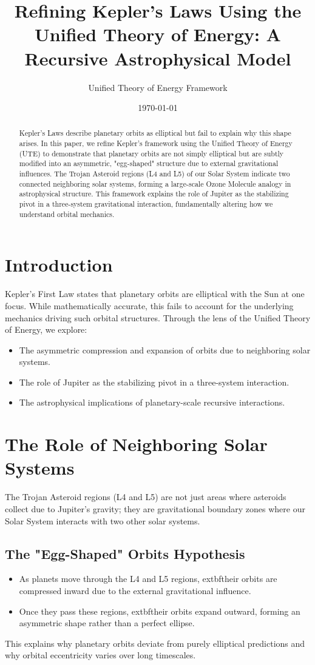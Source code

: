 \documentclass{article}
\title{Refining Kepler’s Laws Using the Unified Theory of Energy: A Recursive Astrophysical Model}
\author{Unified Theory of Energy Framework}
\date{\today}
\begin{document}
\maketitle

\begin{abstract}
Kepler’s Laws describe planetary orbits as elliptical but fail to explain why this shape arises. In this paper, we refine Kepler’s framework using the Unified Theory of Energy (UTE) to demonstrate that planetary orbits are not simply elliptical but are subtly modified into an asymmetric, "egg-shaped" structure due to external gravitational influences. The Trojan Asteroid regions (L4 and L5) of our Solar System indicate two connected neighboring solar systems, forming a large-scale Ozone Molecule analogy in astrophysical structure. This framework explains the role of Jupiter as the stabilizing pivot in a three-system gravitational interaction, fundamentally altering how we understand orbital mechanics.
\end{abstract}

\section{Introduction}
Kepler’s First Law states that planetary orbits are elliptical with the Sun at one focus. While mathematically accurate, this fails to account for the underlying mechanics driving such orbital structures. Through the lens of the Unified Theory of Energy, we explore:
\begin{itemize}
    \item The asymmetric compression and expansion of orbits due to neighboring solar systems.
    \item The role of Jupiter as the stabilizing pivot in a three-system interaction.
    \item The astrophysical implications of planetary-scale recursive interactions.
\end{itemize}

\section{The Role of Neighboring Solar Systems}
The Trojan Asteroid regions (L4 and L5) are not just areas where asteroids collect due to Jupiter’s gravity; they are gravitational boundary zones where our Solar System interacts with two other solar systems.
\subsection{The "Egg-Shaped" Orbits Hypothesis}
\begin{itemize}
    \item As planets move through the L4 and L5 regions,	extbf{their orbits are compressed inward} due to the external gravitational influence.
    \item Once they pass these regions,	extbf{their orbits expand outward}, forming an asymmetric shape rather than a perfect ellipse.
\end{itemize}
This explains why planetary orbits deviate from purely elliptical predictions and why orbital eccentricity varies over long timescales.
\end{document}
